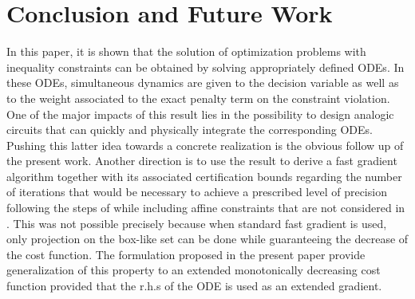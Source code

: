 \documentclass{article}
\begin{document}
\section{Conclusion and Future Work} \label{secconclusion} 
\noindent In this paper, it is shown that the solution of optimization problems with inequality constraints can be obtained by solving appropriately defined ODEs. In these ODEs, simultaneous dynamics are given to the decision variable as well as to the weight associated to the exact penalty term on the constraint violation. One of the major impacts of this result lies in the possibility to design analogic circuits that can quickly and physically integrate the corresponding ODEs. Pushing this latter idea towards a concrete realization is the obvious follow up of the present work. Another direction is to use the result to derive a fast gradient algorithm together with its associated certification bounds regarding the number of iterations that would be necessary to achieve a prescribed level of precision following the steps of \cite{Richter:2012} while including affine constraints that are not considered in \cite{Richter:2012}. This was not possible precisely because when standard fast gradient is used, only projection on the box-like set can be done while guaranteeing the decrease of the cost function. The formulation proposed in the present paper provide generalization of this property to an extended monotonically decreasing cost function provided that the r.h.s of the ODE is used as an extended gradient.  



\end{document}
